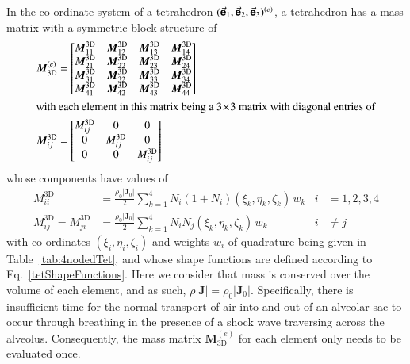 In the co-ordinate system of a tetrahedron $( \vec{\boldsymbol{\mathsf{e}}}_1 , \vec{\boldsymbol{\mathsf{e}}}_2 , \vec{\boldsymbol{\mathsf{e}}}_3  )^{(e)}$, a tetrahedron has a mass matrix with a symmetric block structure of
\begin{subequations}
    \begin{align}
    \boldsymbol{M}^{(e)}_{\mathrm{3D}} & = 
    \begin{bmatrix}
    \boldsymbol{M}^{\mathrm{3D}}_{11} & \boldsymbol{M}^{\mathrm{3D}}_{12} & 
    \boldsymbol{M}^{\mathrm{3D}}_{13} & \boldsymbol{M}^{\mathrm{3D}}_{14} \\
    \boldsymbol{M}^{\mathrm{3D}}_{21} & \boldsymbol{M}^{\mathrm{3D}}_{22} & 
    \boldsymbol{M}^{\mathrm{3D}}_{23} & \boldsymbol{M}^{\mathrm{3D}}_{24} \\
    \boldsymbol{M}^{\mathrm{3D}}_{31} & \boldsymbol{M}^{\mathrm{3D}}_{32} & 
    \boldsymbol{M}^{\mathrm{3D}}_{33} & \boldsymbol{M}^{\mathrm{3D}}_{34} \\
    \boldsymbol{M}^{\mathrm{3D}}_{41} & \boldsymbol{M}^{\mathrm{3D}}_{42} & 
    \boldsymbol{M}^{\mathrm{3D}}_{43} & \boldsymbol{M}^{\mathrm{3D}}_{44} 
    \end{bmatrix} \\
    \intertext{with each element in this matrix being a $3 \! \times \! 3$ matrix with diagonal entries of}
    \boldsymbol{M}^{\mathrm{3D}}_{ij} & = 
    \begin{bmatrix}
    M^{\mathrm{3D}}_{ij} & 0 & 0 \\
    0 & M^{\mathrm{3D}}_{ij} & 0 \\
    0 & 0 & M^{\mathrm{3D}}_{ij}
    \end{bmatrix}
    \end{align}
\end{subequations}
whose components have values of
\begin{subequations}
    \begin{align}
    M_{ii}^{\mathrm{3D}} & = 
    \frac{\rho_0 | \mathbf{J}_0 |}{2} \sum_{k=1}^4 N_i ( 1 + 
    N_i ) ( \xi_k , \eta_k , \zeta_k ) \, w_k & i & = 1,2,3,4 \\
    M_{ij}^{\mathrm{3D}} = M_{ji}^{\mathrm{3D}} & =
    \frac{\rho_0 | \mathbf{J}_0 |}{2} \sum_{k=1}^4
    N_i N_j (\xi_k , \eta_k , \zeta_k) \, w_k & i & \neq j
    \end{align}
\end{subequations}
with co-ordinates $( \xi_i , \eta_i , \zeta_i )$ and weights $w_i$ of quadrature being given in Table~\ref{tab:4nodedTet}, and whose shape functions are defined according to Eq.~\ref{tetShapeFunctions}.  Here we consider that mass is conserved over the volume of each element, and as such, $\rho | \mathbf{J} | = \rho_0 | \mathbf{J}_0 |$.  Specifically, there is insufficient time for the normal transport of air into and out of an alveolar sac to occur through breathing in the presence of a shock wave traversing across the alveolus.   Consequently, the mass matrix $\boldsymbol{M}^{(e)}_{\mathrm{3D}}$ for each element only needs to be evaluated once.

